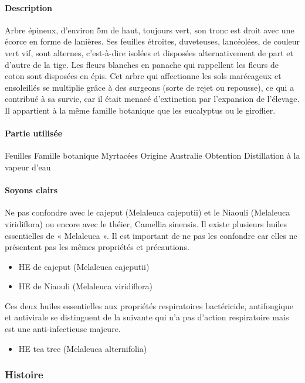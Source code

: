 \documentclass[12pt,a4wide]{article}
\begin{document}
\paragraph{Description}
\label{sec-4-9-2-1}
Arbre épineux, d'environ 5m de haut, toujours vert, son tronc est droit avec une écorce en forme de lanières. Ses feuilles étroites, duveteuses, lancéolées, de couleur vert vif, sont alternes, c'est-à-dire isolées et disposées alternativement de part et d'autre de la tige. Les fleurs blanches en panache qui rappellent les fleurs de coton sont disposées en épis. Cet arbre qui affectionne les sols marécageux et ensoleillés se multiplie grâce à des surgeons (sorte de rejet ou repousse), ce qui a contribué à sa survie, car il était menacé d'extinction par l'expansion de l'élevage. Il appartient à la même famille botanique que les eucalyptus ou le giroflier.

\paragraph{Partie utilisée}
\label{sec-4-9-2-2}
Feuilles
Famille botanique
Myrtacées
Origine
Australie
Obtention
Distillation à la vapeur d'eau


\paragraph{Soyons clairs}
\label{sec-4-9-2-3}

Ne pas confondre avec le cajeput (Melaleuca cajeputii) et le Niaouli (Melaleuca viridiflora) ou encore avec le théier, Camellia sinensis.
Il existe plusieurs huiles essentielles de « Melaleuca ». Il est important de ne pas les confondre car elles ne présentent pas les mêmes propriétés et précautions.
\begin{itemize}
\item HE de cajeput (Melaleuca cajeputii)
\item HE de Niaouli (Melaleuca viridiflora)
\end{itemize}
Ces deux huiles essentielles aux propriétés respiratoires bactéricide, antifongique et antivirale se distinguent de la suivante qui n'a pas d'action respiratoire mais est une anti-infectieuse majeure.
\begin{itemize}
\item HE tea tree (Melaleuca alternifolia)
\end{itemize}

\subsubsection{Histoire}
\label{sec-4-9-3}
\end{document}
